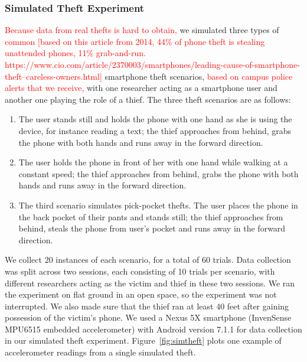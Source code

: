 \subsubsection{Simulated Theft Experiment}
\textcolor{red}{Because data from real thefts is hard to obtain,} we simulated three types of \textcolor{red}{common [based on this article from 2014, 44\% of phone theft is stealing unattended phones, 11\% grab-and-run. https://www.cio.com/article/2370003/smartphones/leading-cause-of-smartphone-theft--careless-owners.html]} smartphone theft scenarios, \textcolor{red}{based on campus police alerts that we receive,} with one researcher acting as a smartphone user and another one playing the role of a thief. 
The three theft scenarios are as follows:
\begin{enumerate}
\item The user stands still and holds the phone with one hand as she is using the device, for instance reading a text; the thief approaches from behind, grabs the phone with both hands and runs away in the forward direction. 
\item The user holds the phone in front of her with one hand while walking at a constant speed; the thief approaches from behind, grabs the phone with both hands and runs away in the forward direction. 
\item The third scenario simulates pick-pocket thefts. The user places the phone in the back pocket of their pants and stands still; the thief approaches from behind, steals the phone from user's pocket and runs away in the forward direction.
\end{enumerate}
We collect 20 instances of each scenario, for a total of 60 trials. 
Data collection was split across two sessions, each consisting of 10 trials per scenario, with different researchers acting as the victim and thief in these two sessions. 
We ran the experiment on flat ground in an open space, so the experiment was not interrupted. 
We also made sure that the thief ran at least 40 feet after gaining possession of the victim's phone.
We used a Nexus 5X smartphone (InvenSense MPU6515 embedded accelerometer) with Android version 7.1.1 for data collection in our simulated theft experiment.
Figure~\ref{fig:simtheft} plots one example of accelerometer readings from a single simulated theft.


